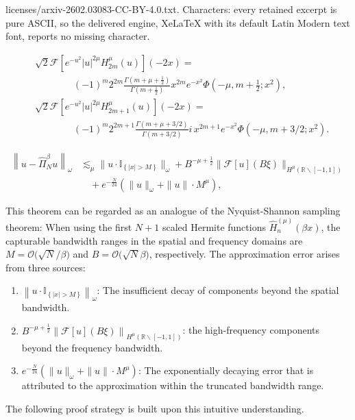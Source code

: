 \documentclass[10pt,a4paper]{amsart}
\begin{document}
licenses/arxiv-2602.03083-CC-BY-4.0.txt. Characters: every retained excerpt is pure ASCII, so the delivered engine, XeLaTeX with its default Latin Modern text font, reports no missing character.
\begin{lemma}\label{lem:transform}
  \begin{equation}\label{eq:0823-2}
    \begin{aligned}
    & \sqrt{2}\mathcal{F}\left[e^{-u^2}|u|^{2 \mu} H_{2 m}^\mu(u)\right](-2x)= \\
    & \qquad\qquad(-1)^m 2^{2 m} \frac{\Gamma\left(m+\mu+\frac{1}{2}\right)}{\Gamma\left(m+\frac{1}{2}\right)} x^{2 m} e^{-x^2} \Phi\left(-\mu, m+\frac{1}{2} ; x^2\right), \\
    & \sqrt{2}\mathcal{F}\left[e^{-u^2}|u|^{2 \mu} H_{2 m+1}^\mu(u)\right](-2x)= \\
    & \qquad \qquad(-1)^m 2^{2 m+1} \frac{\Gamma(m+\mu+3 / 2)}{\Gamma(m+3 / 2)} i\, x^{2 m+1} e^{-x^2} \Phi\left(-\mu, m+3 / 2 ; x^2\right) .
    \end{aligned}
  \end{equation}
\end{lemma}

  \begin{equation}\label{eq:bigthm}
    \begin{aligned}
    \left\|u-\widehat{\Pi}_N^\beta u\right\|_\omega & 
    \lesssim_\mu \bigl\|u \cdot \mathbb{I}_{\left\{|x|>M\right\}}\bigr\|_\omega 
     +B^{-\mu+\frac{1}{2}} \bigl\| \mathcal{F}[u]\left(B \xi\right) \bigr\|_{H^{\mu}\left(\mathbb{R}\backslash [-1,1]\right)} \\
    &{} \quad +e^{-\frac{N}{24}}\left(\|u\|_\omega+\|u\| \cdot M^\mu\right),
    \end{aligned}
  \end{equation}

\begin{remark}
  This theorem can be regarded as an analogue of the Nyquist-Shannon sampling theorem: 
  When using the first $N+1$ scaled Hermite functions $\widehat{H}_n^{(\mu)}(\beta x)$, the capturable bandwidth ranges in the spatial and frequency domains are $M = \mathcal{O}\bigl(\sqrt{N}/\beta\bigr)$ and $B = \mathcal{O}\bigl(\sqrt{N}\beta\bigr)$, respectively. 
  The approximation error arises from three sources: 
  \begin{enumerate}
    \item $\left\|u \cdot \mathbb{I}_{\left\{|x|>M\right\}}\right\|_\omega$:
    The insufficient decay of components beyond the spatial bandwidth.
    \item $B^{-\mu+\frac{1}{2}} \left\| \mathcal{F}[u]\left(B \xi\right) \right\|_{H^{\mu}\left(\mathbb{R}\backslash [-1,1]\right)}$:
    the high-frequency components beyond the frequency bandwidth.
    \item $e^{-\frac{N}{24}}\left(\|u\|_\omega+\|u\| \cdot M^\mu\right)$:
    The exponentially decaying error that is attributed to the approximation 
    within the truncated bandwidth range.
  \end{enumerate}
  The following proof strategy is built upon this intuitive understanding.
\end{remark}
\end{document}
